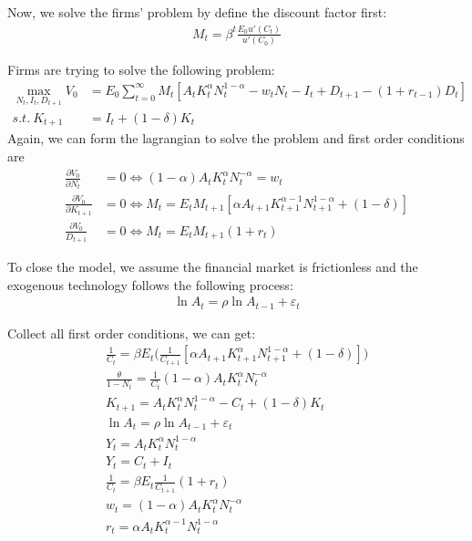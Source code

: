 \documentclass[12pt]{article}
\theoremstyle{definition}
\numberwithin{equation}{section}
\numberwithin{figure}{section}
\numberwithin{table}{section}
\begin{document}
Now, we solve the firms' problem by define the discount factor first:
\begin{align}
  M_t = \beta^t \frac{E_0 u'(C_t)}{u'(C_0)}
\end{align}

Firms are trying to solve the following problem:
\begin{align}
  \max_{N_t, I_t, D_{t+1}} V_0 & = E_0 \sum_{t=0}^\infty M_t [A_t K_t^\alpha N_t^{1-\alpha} - w_t N_t - I_t + D_{t+1} - (1+r_{t-1})D_t] \\
  s.t. \ K_{t+1} & = I_t + (1- \delta) K_t
\end{align}
Again, we can form the lagrangian to solve the problem and first order conditions are
\begin{align}
  \frac{\partial V_0}{\partial N_t} & = 0 \Leftrightarrow (1-\alpha) A_t K_t^\alpha N_t^{-\alpha} = w_t \\
  \frac{\partial V_0}{\partial K_{t+1}} & = 0 \Leftrightarrow M_t = E_t M_{t+1} [\alpha A_{t+1} K_{t+1}^{\alpha - 1} N_{t+1}^{1-\alpha} + (1-\delta)] \\
  \frac{\partial V_0}{D_{t+1}} & = 0 \Leftrightarrow M_t = E_t M_{t+1} (1 + r_t)
\end{align}

To close the model, we assume the financial market is frictionless and the exogenous technology follows the following process:
\begin{align}
  \ln A_t = \rho \ln A_{t-1} + \varepsilon_t
\end{align}

Collect all first order conditions, we can get:
\begin{gather}
  \frac{1}{C_t} = \beta E_t \big (\frac{1}{C_{t+1}} [\alpha A_{t+1} K_{t+1}^\alpha N_{t+1}^{1-\alpha} + (1-\delta)] \big) \\
  \frac{\theta}{1 - N_t} = \frac{1}{C_t} (1-\alpha) A_t K_t^\alpha N_t^{-\alpha} \\
  K_{t+1} = A_t K_t^\alpha N_t^{1-\alpha} - C_t + (1-\delta) K_t \\
  \ln A_t = \rho \ln A_{t-1} + \varepsilon_t \\
  Y_t = A_t K_t^\alpha N_t^{1-\alpha} \\
  Y_t = C_t + I_t \\
  \frac{1}{C_t} = \beta E_t \frac{1}{C_{t+1}}(1+r_t) \\
  w_t = (1-\alpha)A_t K_t^\alpha N_t^{-\alpha} \\
  r_t = \alpha A_t K_t^{\alpha - 1} N_t^{1-\alpha}
\end{gather}
\end{document}
